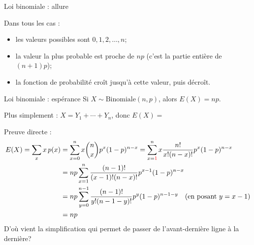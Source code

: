 \documentclass{BeamerTemplate}
\begin{document}
\begin{frame}{Loi binomiale : allure}

\begin{center}
\end{center}

\medskip
{\small
Dans tous les cas :
\begin{itemize}
\item les valeurs possibles sont $0,1,2,\ldots,n$;
\item la valeur la plus probable est proche de $np$ (c'est la partie entière de $(n+1)p$);
\item la fonction de probabilité croît jusqu'à cette valeur, puis décroît.
\end{itemize}
}

\end{frame}

\begin{frame}[t]{Loi binomiale : espérance}
Si $X\sim \text{Binomiale}(n,p)$, alors $E(X)=np$.

\smallskip
Plus simplement : $X=Y_1+\cdots+Y_n$, donc $E(X)=$

\vspace{0.9cm}
{\footnotesize
Preuve directe :
\vspace{-2mm}
\begin{align*}
E(X) = \sum_x x\, p(x) &= \sum_{x=0}^{n} x {n\choose x}p^x(1-p)^{n-x}
= \sum_{x={\color{red}1}}^{n} x \frac{n!}{x!(n-x)!}p^x(1-p)^{n-x} \\
&= np \sum_{x=1}^{n} \frac{(n-1)!}{(x-1)!(n-x)!}p^{x-1}(1-p)^{n-x} \\
&= np \sum_{y=0}^{n-1} \frac{(n-1)!}{y!(n-1-y)!}p^{y}(1-p)^{n-1-y} \quad \mbox{(en posant } y=x-1\mbox{)}\\
& = np
\end{align*}
\vspace{-2mm}
{\color{gray} D'où vient la simplification qui permet de passer de l'avant-dernière ligne à la dernière?}
}

\end{frame}
\end{document}
